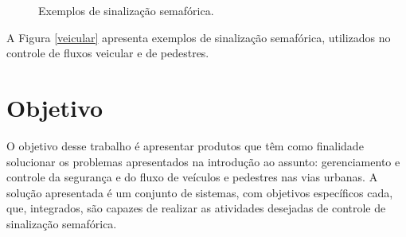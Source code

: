 \begin{figure}[ht]
    \begin{center}
    \caption[Semáforos]{Exemplos de sinalização semafórica.}
    \end{center}
\end{figure}

A Figura \ref{veicular} apresenta exemplos de sinalização semafórica, utilizados no controle de fluxos veicular e de pedestres.

\section{Objetivo}

O objetivo desse trabalho é apresentar produtos que têm como finalidade solucionar os problemas apresentados na introdução ao assunto: gerenciamento e controle da segurança e do fluxo de veículos e pedestres nas vias urbanas. A solução apresentada é um conjunto de sistemas, com objetivos específicos cada, que, integrados, são capazes de realizar as atividades desejadas de controle de sinalização semafórica.

